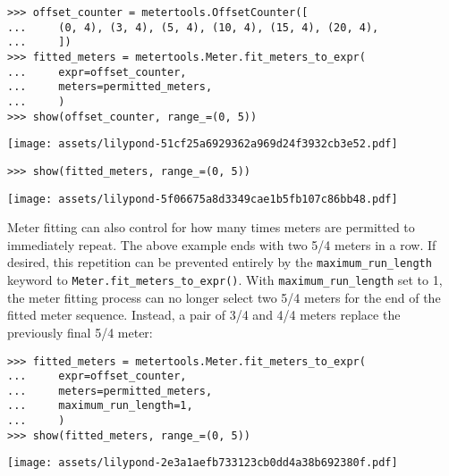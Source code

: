 \begin{comment}
<abjad>
offset_counter = metertools.OffsetCounter([
    (0, 4), (3, 4), (5, 4), (10, 4), (15, 4), (20, 4),
    ])
fitted_meters = metertools.Meter.fit_meters_to_expr(
    expr=offset_counter,
    meters=permitted_meters,
    )
show(offset_counter, range_=(0, 5))
show(fitted_meters, range_=(0, 5))
</abjad>
\end{comment}

\begin{abjadbookoutput}
\begin{singlespacing}
\vspace{-0.5\baselineskip}
\begin{lstlisting}
>>> offset_counter = metertools.OffsetCounter([
...     (0, 4), (3, 4), (5, 4), (10, 4), (15, 4), (20, 4),
...     ])
>>> fitted_meters = metertools.Meter.fit_meters_to_expr(
...     expr=offset_counter,
...     meters=permitted_meters,
...     )
>>> show(offset_counter, range_=(0, 5))
\end{lstlisting}
\noindent\texttt{[image: assets/lilypond-51cf25a6929362a969d24f3932cb3e52.pdf]}
\begin{lstlisting}
>>> show(fitted_meters, range_=(0, 5))
\end{lstlisting}
\noindent\texttt{[image: assets/lilypond-5f06675a8d3349cae1b5fb107c86bb48.pdf]}
\end{singlespacing}
\end{abjadbookoutput}

\noindent Meter fitting can also control for how many times meters are
permitted to immediately repeat. The above example ends with two 5/4 meters in
a row. If desired, this repetition can be prevented entirely by the
\texttt{maximum\_run\_length} keyword to
\texttt{Meter.fit\_meters\_to\_expr()}. With \texttt{maximum\_run\_length} set
to 1, the meter fitting process can no longer select two 5/4 meters for the end
of the fitted meter sequence. Instead, a pair of 3/4 and 4/4 meters replace the
previously final 5/4 meter:

\begin{comment}
<abjad>
fitted_meters = metertools.Meter.fit_meters_to_expr(
    expr=offset_counter,
    meters=permitted_meters,
    maximum_run_length=1,
    )
show(fitted_meters, range_=(0, 5))
</abjad>
\end{comment}

\begin{abjadbookoutput}
\begin{singlespacing}
\vspace{-0.5\baselineskip}
\begin{lstlisting}
>>> fitted_meters = metertools.Meter.fit_meters_to_expr(
...     expr=offset_counter,
...     meters=permitted_meters,
...     maximum_run_length=1,
...     )
>>> show(fitted_meters, range_=(0, 5))
\end{lstlisting}
\noindent\texttt{[image: assets/lilypond-2e3a1aefb733123cb0dd4a38b692380f.pdf]}
\end{singlespacing}
\end{abjadbookoutput}

